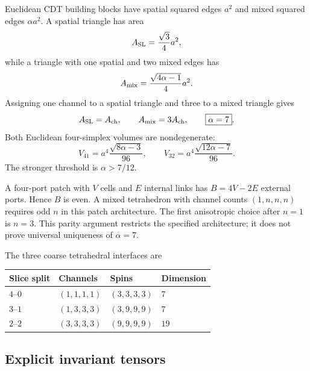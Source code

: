 Euclidean CDT building blocks have spatial squared edges $a^2$ and mixed squared edges $\alpha a^2$. A spatial triangle has area
\begin{equation}
A_{\rm SL}=\frac{\sqrt3}{4}a^2,
\end{equation}
while a triangle with one spatial and two mixed edges has
\begin{equation}
A_{\rm mix}=\frac{\sqrt{4\alpha-1}}4a^2.
\end{equation}
Assigning one channel to a spatial triangle and three to a mixed triangle gives
\begin{equation}
A_{\rm SL}=A_{\rm ch},\qquad A_{\rm mix}=3A_{\rm ch},
\qquad \boxed{\alpha=7}.
\label{eq:alpha7}
\end{equation}
Both Euclidean four-simplex volumes are nondegenerate:
\begin{equation}
V_{41}=a^4\frac{\sqrt{8\alpha-3}}{96},\qquad
V_{32}=a^4\frac{\sqrt{12\alpha-7}}{96}.
\end{equation}
The stronger threshold is $\alpha>7/12$.

A four-port patch with $V$ cells and $E$ internal links has $B=4V-2E$ external ports. Hence $B$ is even. A mixed tetrahedron with channel counts $(1,n,n,n)$ requires odd $n$ in this patch architecture. The first anisotropic choice after $n=1$ is $n=3$. This parity argument restricts the specified architecture; it does not prove universal uniqueness of $\alpha=7$.

The three coarse tetrahedral interfaces are
\begin{center}
\begin{tabular}{llll}
\toprule Slice split & Channels & Spins & Dimension\\\midrule
$4$--$0$ & $(1,1,1,1)$ & $(3,3,3,3)$ & $7$\\
$3$--$1$ & $(1,3,3,3)$ & $(3,9,9,9)$ & $7$\\
$2$--$2$ & $(3,3,3,3)$ & $(9,9,9,9)$ & $19$\\
\bottomrule
\end{tabular}
\end{center}

\subsection{Explicit invariant tensors}

